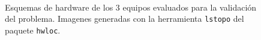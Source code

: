 \begin{figure}
\centering
\hspace*{\fill}
\hspace*{\fill}
\hspace*{\fill}
\\
\caption{Esquemas de hardware de los 3 equipos evaluados para la validación del problema. Imagenes generadas con la herramienta \texttt{lstopo} del paquete \texttt{hwloc}.}
\end{figure}


